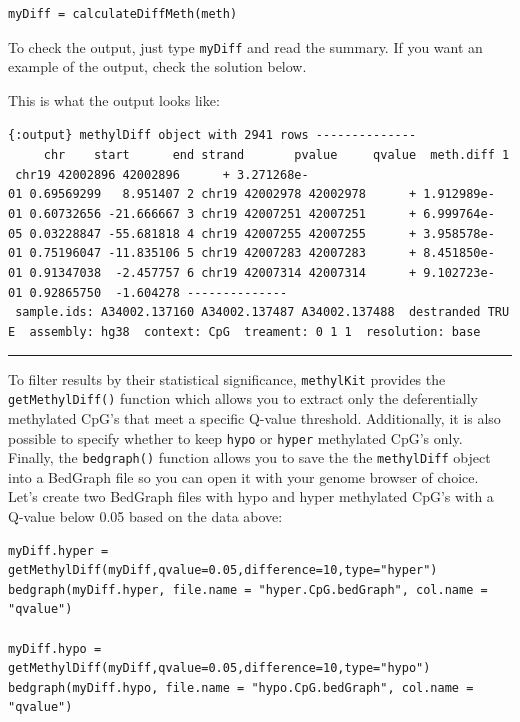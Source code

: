 \documentclass[
]{book}
\begin{document}
\begin{verbatim}
myDiff = calculateDiffMeth(meth)
\end{verbatim}

To check the output, just type \texttt{myDiff} and read the summary. If you want an example of the output, check the solution below.

This is what the output looks like:

\texttt{\{:output\}\ methylDiff\ object\ with\ 2941\ rows\ -\/-\/-\/-\/-\/-\/-\/-\/-\/-\/-\/-\/-\/-\ \ \ \ \ chr\ \ \ \ start\ \ \ \ \ \ end\ strand\ \ \ \ \ \ \ pvalue\ \ \ \ \ qvalue\ \ meth.diff\ 1\ chr19\ 42002896\ 42002896\ \ \ \ \ \ +\ 3.271268e-01\ 0.69569299\ \ \ 8.951407\ 2\ chr19\ 42002978\ 42002978\ \ \ \ \ \ +\ 1.912989e-01\ 0.60732656\ -21.666667\ 3\ chr19\ 42007251\ 42007251\ \ \ \ \ \ +\ 6.999764e-05\ 0.03228847\ -55.681818\ 4\ chr19\ 42007255\ 42007255\ \ \ \ \ \ +\ 3.958578e-01\ 0.75196047\ -11.835106\ 5\ chr19\ 42007283\ 42007283\ \ \ \ \ \ +\ 8.451850e-01\ 0.91347038\ \ -2.457757\ 6\ chr19\ 42007314\ 42007314\ \ \ \ \ \ +\ 9.102723e-01\ 0.92865750\ \ -1.604278\ -\/-\/-\/-\/-\/-\/-\/-\/-\/-\/-\/-\/-\/-\ sample.ids:\ A34002.137160\ A34002.137487\ A34002.137488\ \ destranded\ TRUE\ \ assembly:\ hg38\ \ context:\ CpG\ \ treament:\ 0\ 1\ 1\ \ resolution:\ base}

\begin{center}\rule{0.5\linewidth}{0.5pt}\end{center}

To filter results by their statistical significance, \texttt{methylKit} provides the \texttt{getMethylDiff()} function which allows you to extract only the deferentially methylated CpG's that meet a specific Q-value threshold. Additionally, it is also possible to specify whether to keep \texttt{hypo} or \texttt{hyper} methylated CpG's only. Finally, the \texttt{bedgraph()} function allows you to save the the \texttt{methylDiff} object into a BedGraph file so you can open it with your genome browser of choice. Let's create two BedGraph files with hypo and hyper methylated CpG's with a Q-value below 0.05 based on the data above:

\begin{verbatim}
myDiff.hyper = getMethylDiff(myDiff,qvalue=0.05,difference=10,type="hyper")
bedgraph(myDiff.hyper, file.name = "hyper.CpG.bedGraph", col.name = "qvalue")

myDiff.hypo = getMethylDiff(myDiff,qvalue=0.05,difference=10,type="hypo")
bedgraph(myDiff.hypo, file.name = "hypo.CpG.bedGraph", col.name = "qvalue")
\end{verbatim}
\end{document}
